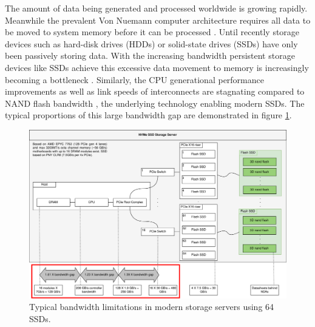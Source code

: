 The amount of data being generated and processed worldwide is growing rapidly.
Meanwhile the prevalent Von Nuemann computer architecture requires all data to
be moved to system memory before it can be processed
\cite{2018-neumann-bottleneck}. Until recently storage devices such as hard-disk
drives (HDDs) or solid-state drives (SSDs) have only been passively storing
data. With the increasing bandwidth persistent storage devices like SSDs achieve
this excessive data movement to memory is increasingly becoming a bottleneck
\cite{2014-micro-ndp}. Similarly, the CPU generational performance
improvements \cite{2016-western-digital} as well as link speeds of interconnects
are stagnating compared to NAND flash bandwidth \cite{10.1145/3286588}, the
underlying technology enabling modern SSDs. The typical proportions of this
large bandwidth gap are demonstrated in figure \ref{figure:storagebottleneck}.

\begin{figure}
    \centering
	\includegraphics[width=1\textwidth]{resources/images/storage-bottleneck.png}
	\caption{Typical bandwidth limitations in modern storage servers using 64
        SSDs.}
    \label{figure:storagebottleneck}
\end{figure}



